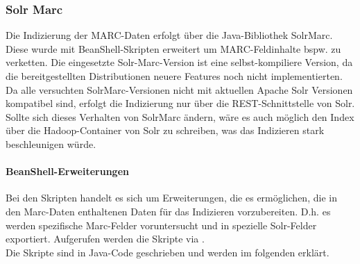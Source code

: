 \documentclass[10pt]{article}
\begin{document}
\subsubsection{Solr Marc}
Die Indizierung der MARC-Daten erfolgt über die Java-Bibliothek SolrMarc. Diese wurde mit BeanShell-Skripten erweitert um MARC-Feldinhalte bspw. zu verketten. Die eingesetzte Solr-Marc-Version ist eine selbst-kompiliere Version, da die bereitgestellten Distributionen neuere Features noch nicht implementierten. \\
Da alle versuchten SolrMarc-Versionen nicht mit aktuellen Apache Solr Versionen kompatibel sind, erfolgt die Indizierung nur über die REST-Schnittstelle von Solr. Sollte sich dieses Verhalten von SolrMarc ändern, wäre es auch möglich den Index über die Hadoop-Container von Solr zu schreiben, was das Indizieren stark beschleunigen würde.

\paragraph{BeanShell-Erweiterungen}
Bei den Skripten handelt es sich um Erweiterungen, die es ermöglichen, die in den Marc-Daten enthaltenen Daten für das Indizieren vorzubereiten. D.h. es werden spezifische Marc-Felder voruntersucht und in spezielle Solr-Felder exportiert. Aufgerufen werden die Skripte via . \\ %
Die Skripte sind in Java-Code geschrieben und werden im folgenden erklärt.
\end{document}
